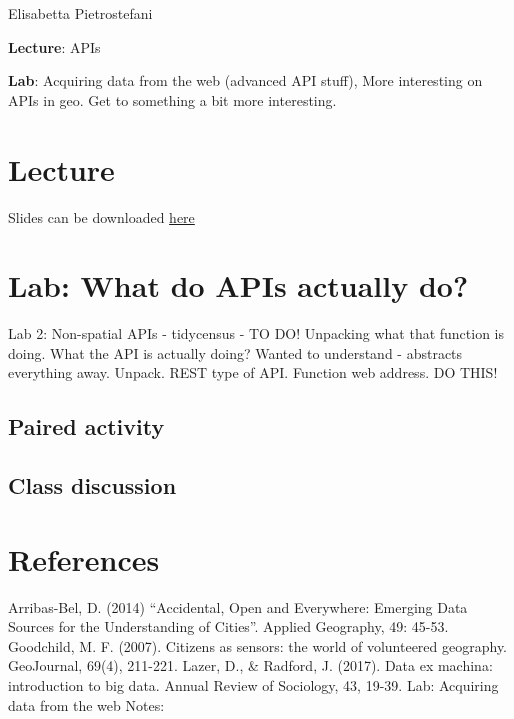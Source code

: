 \documentclass[
  letterpaper,
  DIV=11,
  numbers=noendperiod]{scrreprt}
\begin{document}
Elisabetta Pietrostefani

\textbf{Lecture}: APIs

\textbf{Lab}: Acquiring data from the web (advanced API stuff), More
interesting on APIs in geo. Get to something a bit more interesting.

\hypertarget{lecture-3}{%
\section{Lecture}\label{lecture-3}}

Slides can be downloaded
\href{https://github.com/GDSL-UL/wma/raw/main/pdf/lecture_04.pdf}{here}

\hypertarget{lab-what-do-apis-actually-do-1}{%
\section{Lab: What do APIs actually
do?}\label{lab-what-do-apis-actually-do-1}}

Lab 2: Non-spatial APIs - tidycensus - TO DO! Unpacking what that
function is doing. What the API is actually doing? Wanted to understand
- abstracts everything away. Unpack. REST type of API. Function web
address. DO THIS!

\hypertarget{paired-activity-2}{%
\subsection{Paired activity}\label{paired-activity-2}}

\hypertarget{class-discussion-2}{%
\subsection{Class discussion}\label{class-discussion-2}}

\hypertarget{references-3}{%
\section{References}\label{references-3}}

Arribas-Bel, D. (2014) ``Accidental, Open and Everywhere: Emerging Data
Sources for the Understanding of Cities''. Applied Geography, 49: 45-53.
Goodchild, M. F. (2007). Citizens as sensors: the world of volunteered
geography. GeoJournal, 69(4), 211-221. Lazer, D., \& Radford, J. (2017).
Data ex machina: introduction to big data. Annual Review of Sociology,
43, 19-39. Lab: Acquiring data from the web Notes:
\end{document}

